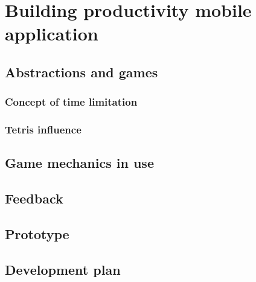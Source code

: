 \chapter{Building productivity mobile application}

\section{Abstractions and games}
\subsection{Concept of time limitation}
\subsection{Tetris influence}
\section{Game mechanics in use}
\section{Feedback}
\section{Prototype}
\section{Development plan}